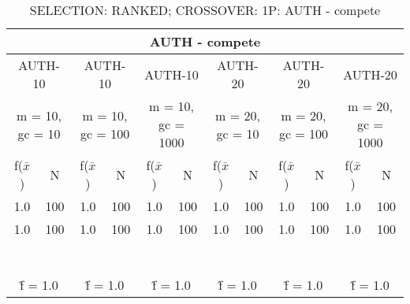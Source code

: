 \begin{table}[H]
	\centering
	\caption{SELECTION: RANKED; CROSSOVER: 1P: AUTH - compete}
	\begin{adjustbox}{width=1\textwidth}
		\begin{tabular}{ |c|c||c|c||c|c||c|c||c|c||c|c| }
			\hline
			\multicolumn{12}{|c|}{AUTH - compete} \\
			\hline
			\multicolumn{2}{|c||}{AUTH-10} & \multicolumn{2}{c||}{AUTH-10} & \multicolumn{2}{c||}{AUTH-10} & \multicolumn{2}{c||}{AUTH-20} & \multicolumn{2}{c||}{AUTH-20} & \multicolumn{2}{c|}{AUTH-20}\\
			\hline
			\multicolumn{2}{|c||}{m = 10, gc = 10} & \multicolumn{2}{c||}{m = 10, gc = 100} & \multicolumn{2}{c||}{m = 10, gc = 1000} & \multicolumn{2}{c||}{m = 20, gc = 10} & \multicolumn{2}{c||}{m = 20, gc = 100} & \multicolumn{2}{c|}{m = 20, gc = 1000}\\
			\hline
			f($\bar{x}$) & N & f($\bar{x}$) & N & f($\bar{x}$) & N & f($\bar{x}$) & N & f($\bar{x}$) & N & f($\bar{x}$) & N\\
			\hline
			\hline
			1.0 & 100 & 1.0 & 100 & 1.0 & 100 & 1.0 & 100 & 1.0 & 100 & 1.0 & 100\\
			\hline
			1.0 & 100 & 1.0 & 100 & 1.0 & 100 & 1.0 & 100 & 1.0 & 100 & 1.0 & 100\\
			&   &   &   &   &   &   &   &   &   &   &  \\
			&   &   &   &   &   &   &   &   &   &   &  \\
			&   &   &   &   &   &   &   &   &   &   &  \\
			&   &   &   &   &   &   &   &   &   &   &  \\
			&   &   &   &   &   &   &   &   &   &   &  \\
			&   &   &   &   &   &   &   &   &   &   &  \\
			&   &   &   &   &   &   &   &   &   &   &  \\
			\hline
			\multicolumn{2}{|c||}{\^{f} = 1.0} & \multicolumn{2}{c||}{\^{f} = 1.0} & \multicolumn{2}{c||}{\^{f} = 1.0} & \multicolumn{2}{c||}{\^{f} = 1.0} & \multicolumn{2}{c||}{\^{f} = 1.0} & \multicolumn{2}{c|}{\^{f} = 1.0}\\
			\hline
		\end{tabular}
	\end{adjustbox}
\end{table}

